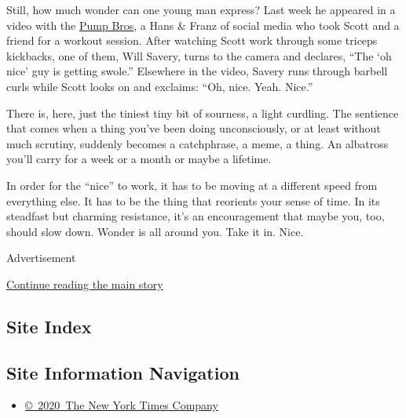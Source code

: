 Still, how much wonder can one young man express? Last week he appeared
in a video with the
\href{https://www.youtube.com/watch?v=YJdZQb8VOZk}{Pump Bros}, a Hans \&
Franz of social media who took Scott and a friend for a workout session.
After watching Scott work through some triceps kickbacks, one of them,
Will Savery, turns to the camera and declares, ``The `oh nice' guy is
getting swole.'' Elsewhere in the video, Savery runs through barbell
curls while Scott looks on and exclaims: ``Oh, nice. Yeah. Nice.''

There is, here, just the tiniest tiny bit of sourness, a light curdling.
The sentience that comes when a thing you've been doing unconsciously,
or at least without much scrutiny, suddenly becomes a catchphrase, a
meme, a thing. An albatross you'll carry for a week or a month or maybe
a lifetime.

In order for the ``nice'' to work, it has to be moving at a different
speed from everything else. It has to be the thing that reorients your
sense of time. In its steadfast but charming resistance, it's an
encouragement that maybe you, too, should slow down. Wonder is all
around you. Take it in. Nice.

Advertisement

\protect\hyperlink{after-bottom}{Continue reading the main story}

\hypertarget{site-index}{%
\subsection{Site Index}\label{site-index}}

\hypertarget{site-information-navigation}{%
\subsection{Site Information
Navigation}\label{site-information-navigation}}

\begin{itemize}
\tightlist
\item
  \href{https://help.nytimes.com/hc/en-us/articles/115014792127-Copyright-notice}{©~2020~The
  New York Times Company}
\end{itemize}

